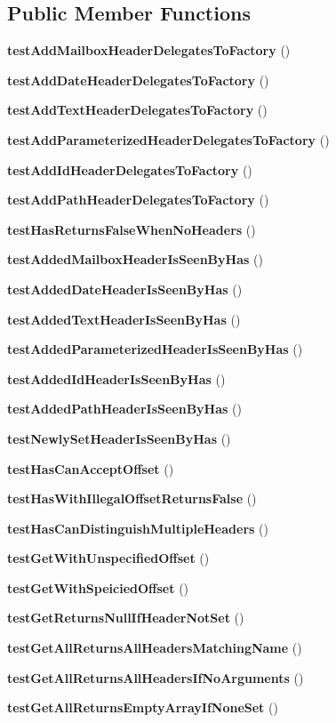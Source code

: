\subsection*{Public Member Functions}
\begin{DoxyCompactItemize}
\item 
{\bf test\+Add\+Mailbox\+Header\+Delegates\+To\+Factory} ()
\item 
{\bf test\+Add\+Date\+Header\+Delegates\+To\+Factory} ()
\item 
{\bf test\+Add\+Text\+Header\+Delegates\+To\+Factory} ()
\item 
{\bf test\+Add\+Parameterized\+Header\+Delegates\+To\+Factory} ()
\item 
{\bf test\+Add\+Id\+Header\+Delegates\+To\+Factory} ()
\item 
{\bf test\+Add\+Path\+Header\+Delegates\+To\+Factory} ()
\item 
{\bf test\+Has\+Returns\+False\+When\+No\+Headers} ()
\item 
{\bf test\+Added\+Mailbox\+Header\+Is\+Seen\+By\+Has} ()
\item 
{\bf test\+Added\+Date\+Header\+Is\+Seen\+By\+Has} ()
\item 
{\bf test\+Added\+Text\+Header\+Is\+Seen\+By\+Has} ()
\item 
{\bf test\+Added\+Parameterized\+Header\+Is\+Seen\+By\+Has} ()
\item 
{\bf test\+Added\+Id\+Header\+Is\+Seen\+By\+Has} ()
\item 
{\bf test\+Added\+Path\+Header\+Is\+Seen\+By\+Has} ()
\item 
{\bf test\+Newly\+Set\+Header\+Is\+Seen\+By\+Has} ()
\item 
{\bf test\+Has\+Can\+Accept\+Offset} ()
\item 
{\bf test\+Has\+With\+Illegal\+Offset\+Returns\+False} ()
\item 
{\bf test\+Has\+Can\+Distinguish\+Multiple\+Headers} ()
\item 
{\bf test\+Get\+With\+Unspecified\+Offset} ()
\item 
{\bf test\+Get\+With\+Speicied\+Offset} ()
\item 
{\bf test\+Get\+Returns\+Null\+If\+Header\+Not\+Set} ()
\item 
{\bf test\+Get\+All\+Returns\+All\+Headers\+Matching\+Name} ()
\item 
{\bf test\+Get\+All\+Returns\+All\+Headers\+If\+No\+Arguments} ()
\item 
{\bf test\+Get\+All\+Returns\+Empty\+Array\+If\+None\+Set} ()

\end{DoxyCompactItemize}

